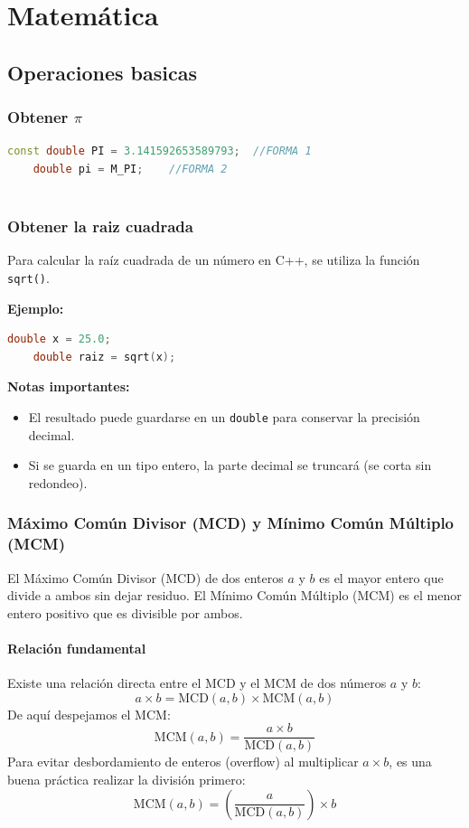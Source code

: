 \chapter{Matemática}

\section{Operaciones basicas}

\subsection{Obtener $\pi$}
\begin{lstlisting}[language=C++, caption={Obtener $\pi$}]
	const double PI = 3.141592653589793;  //FORMA 1
	double pi = M_PI; 	 //FORMA 2
	
\end{lstlisting}

\subsection{Obtener la raiz cuadrada}
Para calcular la raíz cuadrada de un número en C++, se utiliza la función \texttt{sqrt()}.

\bigskip

\textbf{Ejemplo:}

\begin{lstlisting}[language=C++]
	double x = 25.0;
	double raiz = sqrt(x);
\end{lstlisting}

\bigskip

\textbf{Notas importantes:}
\begin{itemize}
	\item El resultado puede guardarse en un \texttt{double} para conservar la precisión decimal.
	\item Si se guarda en un tipo entero, la parte decimal se truncará (se corta sin redondeo).
\end{itemize}

\subsection{Máximo Común Divisor (MCD) y Mínimo Común Múltiplo (MCM)}
El Máximo Común Divisor (MCD) de dos enteros $a$ y $b$ es el mayor entero que divide a ambos sin dejar residuo. El Mínimo Común Múltiplo (MCM) es el menor entero positivo que es divisible por ambos.

\subsubsection*{Relación fundamental}
Existe una relación directa entre el MCD y el MCM de dos números $a$ y $b$:
\[
a \times b = \text{MCD}(a, b) \times \text{MCM}(a, b)
\]
De aquí despejamos el MCM:
\[
\text{MCM}(a, b) = \frac{a \times b}{\text{MCD}(a, b)}
\]
Para evitar desbordamiento de enteros (overflow) al multiplicar $a \times b$, es una buena práctica realizar la división primero:
\[
\text{MCM}(a, b) = \left( \frac{a}{\text{MCD}(a, b)} \right) \times b
\]

